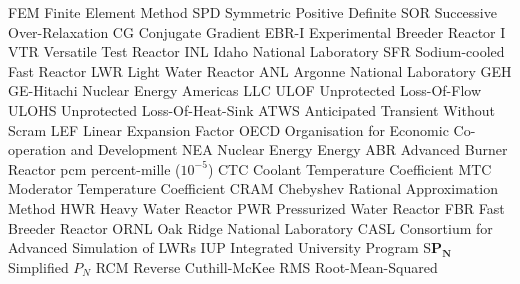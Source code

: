 \makeglossaries

   {FEM}   {Finite Element Method}
   {SPD}   {Symmetric Positive Definite}
   {SOR}   {Successive Over-Relaxation}
    {CG}    {Conjugate Gradient}
 {EBR-I} {Experimental Breeder Reactor I}
   {VTR}   {Versatile Test Reactor}
   {INL}   {Idaho National Laboratory}
   {SFR}   {Sodium-cooled Fast Reactor}
   {LWR}   {Light Water Reactor}
   {ANL}   {Argonne National Laboratory}
   {GEH}   {GE-Hitachi Nuclear Energy Americas LLC}
  {ULOF}  {Unprotected Loss-Of-Flow}
 {ULOHS} {Unprotected Loss-Of-Heat-Sink}
  {ATWS}  {Anticipated Transient Without Scram}
   {LEF}   {Linear Expansion Factor}
  {OECD}  {Organisation for Economic Co-operation and Development}
   {NEA}   {Nuclear Energy Energy}
   {ABR}   {Advanced Burner Reactor}
   {pcm}   {percent-mille ($10^{-5}$)}
   {CTC}   {Coolant Temperature Coefficient}
   {MTC}   {Moderator Temperature Coefficient}
  {CRAM}  {Chebyshev Rational Approximation Method}
   {HWR}   {Heavy Water Reactor}
   {PWR}   {Pressurized Water Reactor}
   {FBR}   {Fast Breeder Reactor}
  {ORNL}  {Oak Ridge National Laboratory}
  {CASL}  {Consortium for Advanced Simulation of LWRs}
   {IUP}   {Integrated University Program}
   {S$\mathbf{P_N}$}{Simplified $P_N$}
   {RCM}   {Reverse Cuthill-McKee}
   {RMS}   {Root-Mean-Squared}
